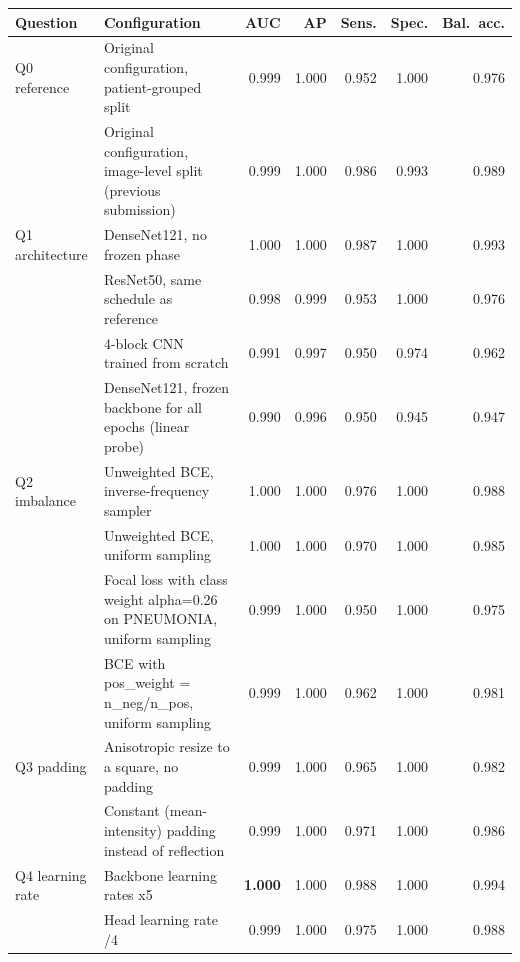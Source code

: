 \begin{tabular}{llrrrrr}
\toprule
Question & Configuration & AUC & AP & Sens. & Spec. & Bal.\ acc. \\
\midrule
Q0 reference & Original configuration, patient-grouped split & 0.999 & 1.000 & 0.952 & 1.000 & 0.976 \\
 & Original configuration, image-level split (previous submission) & 0.999 & 1.000 & 0.986 & 0.993 & 0.989 \\
\midrule
Q1 architecture & DenseNet121, no frozen phase & 1.000 & 1.000 & 0.987 & 1.000 & 0.993 \\
 & ResNet50, same schedule as reference & 0.998 & 0.999 & 0.953 & 1.000 & 0.976 \\
 & 4-block CNN trained from scratch & 0.991 & 0.997 & 0.950 & 0.974 & 0.962 \\
 & DenseNet121, frozen backbone for all epochs (linear probe) & 0.990 & 0.996 & 0.950 & 0.945 & 0.947 \\
\midrule
Q2 imbalance & Unweighted BCE, inverse-frequency sampler & 1.000 & 1.000 & 0.976 & 1.000 & 0.988 \\
 & Unweighted BCE, uniform sampling & 1.000 & 1.000 & 0.970 & 1.000 & 0.985 \\
 & Focal loss with class weight alpha=0.26 on PNEUMONIA, uniform sampling & 0.999 & 1.000 & 0.950 & 1.000 & 0.975 \\
 & BCE with pos\_weight = n\_neg/n\_pos, uniform sampling & 0.999 & 1.000 & 0.962 & 1.000 & 0.981 \\
\midrule
Q3 padding & Anisotropic resize to a square, no padding & 0.999 & 1.000 & 0.965 & 1.000 & 0.982 \\
 & Constant (mean-intensity) padding instead of reflection & 0.999 & 1.000 & 0.971 & 1.000 & 0.986 \\
\midrule
Q4 learning rate & Backbone learning rates x5 & \textbf{1.000} & 1.000 & 0.988 & 1.000 & 0.994 \\
 & Head learning rate /4 & 0.999 & 1.000 & 0.975 & 1.000 & 0.988 \\
\bottomrule
\end{tabular}